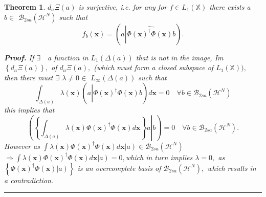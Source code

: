 \documentclass[aps,preprint]{revtex4}%
\newtheorem{theorem}{Theorem}
\newenvironment{proof}[1][Proof]{\noindent\textbf{#1.} }{\ \rule{0.5em}{0.5em}}
\begin{document}
\begin{theorem}
$d_{a}\Xi\left(  a\right)  $ is surjective, i.e. for any for $f\in
L_{1}\left(  \mathbb{X}\right)  $ there exists a $b\in$ $\mathcal{B}%
_{2sa}\left(  \mathcal{H}^{N}\right)  $ such that
\begin{equation}
f_{b}\left(  \mathbf{x}\right)  =\left(  a\left\vert \widehat{\Phi\left(
\mathbf{x}\right)  ^{\dagger}\Phi\left(  \mathbf{x}\right)  }\right.
b\right)  \mathbf{.}%
\end{equation}


\begin{proof}
If $\exists\quad$a function in $L_{1}\left(  \mathbb{\Delta}\left(  a\right)
\right)  $ that is not in the image, Im$\left\{  d_{a}\Xi\left(  a\right)
\right\}  ,$ of $d_{a}\Xi\left(  a\right)  ,$ (which must form a closed
subspace of $L_{1}\left(  \mathbb{X}\right)  ),$ then there must $\exists$
$\lambda\neq0\in$ $L_{\infty}\left(  \mathbb{\Delta}\left(  a\right)  \right)
$ such that
\begin{equation}
\int_{\mathbb{\Delta}\left(  a\right)  }\lambda\left(  \mathbf{x}\right)
\left(  a\left\vert \widehat{\Phi\left(  \mathbf{x}\right)  ^{\dagger}%
\Phi\left(  \mathbf{x}\right)  }\right.  b\right)  d\mathbf{x}=0\quad\forall
b\in\mathcal{B}_{2sa}\left(  \mathcal{H}^{N}\right)
\end{equation}
this implies that
\begin{equation}
\left(  \left.  \left\{  \int_{\mathbb{\Delta}\left(  a\right)  }%
\lambda\left(  \mathbf{x}\right)  \Phi\left(  \mathbf{x}\right)  ^{\dagger
}\Phi\left(  \mathbf{x}\right)  d\mathbf{x}\right\}  a\right\vert b\right)
=0\quad\forall b\in\mathcal{B}_{2sa}\left(  \mathcal{H}^{N}\right)  .
\end{equation}
However as $\int\lambda\left(  \mathbf{x}\right)  \Phi\left(  \mathbf{x}%
\right)  ^{\dagger}\Phi\left(  \mathbf{x}\right)  d\mathbf{x}\left\vert
a\right)  \in\mathcal{B}_{2sa}\left(  \mathcal{H}^{N}\right)  $ $\Rightarrow
\int\lambda\left(  \mathbf{x}\right)  \Phi\left(  \mathbf{x}\right)
^{\dagger}\Phi\left(  \mathbf{x}\right)  d\mathbf{x}\left\vert a\right)
=0,$which in turn implies $\lambda=0,$ as $\left\{  \Phi\left(  \mathbf{x}%
\right)  ^{\dagger}\Phi\left(  \mathbf{x}\right)  \left\vert a\right)
\right\}  $ is an overcomplete basis of $\mathcal{B}_{2sa}\left(
\mathcal{H}^{N}\right)  ,$ which results in a contradiction.
\end{proof}
\end{theorem}
\end{document}
